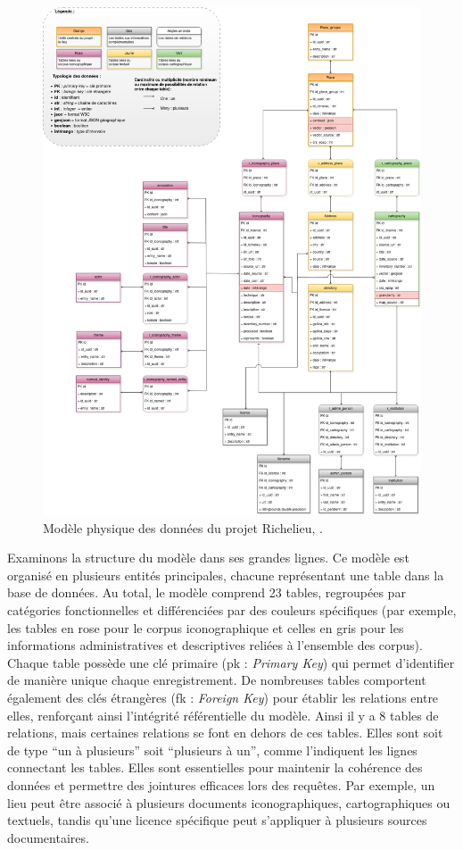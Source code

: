 \begin{figure}
    \centering
    \includegraphics[width=1\linewidth]{images/modele-physique-bddr.drawio.png}
    \caption{Modèle physique des données du projet Richelieu, \mhd.}
    \label{fig:modele-physique-bdd}
\end{figure}

Examinons la structure du modèle dans ses grandes lignes. Ce modèle est organisé en plusieurs entités principales, chacune représentant une table dans la base de données. Au total, le modèle comprend 23 tables, regroupées par catégories fonctionnelles et différenciées par des couleurs spécifiques (par exemple, les tables en rose pour le corpus iconographique et celles en gris pour les informations administratives et descriptives reliées à l'ensemble des corpus). Chaque table possède une clé primaire (\acrshort{pk} : \textit{Primary Key}) qui permet d’identifier de manière unique chaque enregistrement. De nombreuses tables comportent également des clés étrangères (\acrshort{fk} : \textit{Foreign Key}) pour établir les relations entre elles, renforçant ainsi l'intégrité référentielle du modèle. Ainsi il y a 8 tables de relations, mais certaines relations se font en dehors de ces tables. Elles sont soit de type \enquote{un à plusieurs} soit \enquote{plusieurs à un}, comme l'indiquent les lignes connectant les tables. Elles sont essentielles pour maintenir la cohérence des données et permettre des jointures efficaces lors des requêtes. Par exemple, un lieu peut être associé à plusieurs documents iconographiques, cartographiques ou textuels, tandis qu'une licence spécifique peut s’appliquer à plusieurs sources documentaires.

